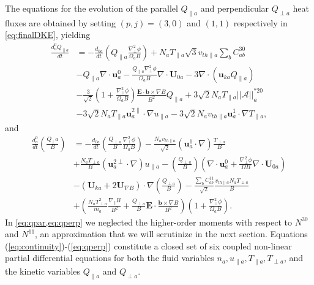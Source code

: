 {{\begin{equation}
\end{equation}
%
The equations for the evolution of the parallel $Q_{\parallel a}$ and perpendicular $Q_{\perp a}$ heat fluxes are obtained by setting $(p,j)=(3,0)$ and $(1,1)$ respectively in \cref{eq:finalDKE}, yielding
%
\begin{equation}
    \begin{split}
        \frac{d_a^0 Q_{\parallel a}}{dt} &=-  \frac{d_{0 a}}{dt}\left(Q_{\parallel a}\frac{\nabla_\perp^2 \phi}{\Omega_a B}\right)+N_a T_{\parallel a} \sqrt{3} v_{th\parallel a} \sum_b C_{ab}^{30} \\
        &-Q_{\parallel a}\nabla \cdot \mathbf u_a^0- \frac{Q_{\parallel a} \nabla_\perp^2 \phi}{\Omega_a B}\nabla \cdot \mathbf U_{0 a} - 3 \nabla \cdot (\mathbf u_{k a} Q_{\parallel a})\\
        &-\frac{3}{\sqrt{2}}\left(1+\frac{\nabla_\perp^2 \phi}{\Omega_a B}\right)\frac{\mathbf E \cdot \mathbf b \times \nabla B}{B^2}Q_{\parallel a}+3 \sqrt{2}N_a T_{\parallel a} ||\mathcal{A}||_a^{*20}\\
        &-3 \sqrt{2}N_a T_{\parallel a} \mathbf u_a^{2\parallel} \cdot \nabla u_{\parallel a} - 3 \sqrt{2}N_a v_{th\parallel a} \mathbf u_a^1 \cdot \nabla T_{\parallel a},
    \end{split}
    \label{eq:qpar}
\end{equation}
%
and
%
\begin{equation}
    \begin{split}
        \frac{d_a^0}{dt}\left(\frac{Q_\perp a}{B}\right)&=- \frac{d_{0 a}}{dt}\left(\frac{Q_{\perp a}}{B}\frac{\nabla_\perp^2 \phi}{\Omega_a B}\right)-\frac{N_a v_{th\parallel a}}{\sqrt{2}}(\mathbf u_a^1 \cdot \nabla) \frac{T_{\perp a}}{B}\\
        &+\frac{N_a T_{\perp a}}{B}(\mathbf u_a^{2\perp} \cdot \nabla) u_{\parallel a}-\left(\frac{Q_{\perp a}}{B}\right)\left(\nabla \cdot \mathbf u_a^0 + \frac{\nabla_\perp^2 \phi}{\Omega B}\nabla \cdot \mathbf U_{0 a}\right)\\
        &-(\mathbf U_{k a} + 2 \mathbf U_{\nabla B})\cdot \nabla \left(\frac{Q_{\perp a}}{B}\right)-\frac{\sum_b C_{ab}^{11}}{\sqrt{2}}\frac{v_{th\parallel a}N_a T_{\perp a}}{B}\\
        &+\left(\frac{N_a T_{\perp a}^2}{m_a}\frac{\nabla_\parallel B}{B^2}+\frac{Q_{\perp a}}{B}\mathbf E \cdot \frac{\mathbf b \times \nabla B}{B^2}\right)\left(1+\frac{\nabla_\perp^2 \phi}{\Omega_a B}\right).
    \end{split}
    \label{eq:qperp}
\end{equation}
%
{In \cref{eq:qpar,eq:qperp} we neglected the higher-order moments with respect to $N^{30}$ and $N^{11}$, an approximation that we will scrutinize in the next section.}
Equations (\ref{eq:continuity})-(\ref{eq:qperp}) constitute a closed set of six coupled non-linear partial differential equations for both the fluid variables $n_a, u_{\parallel a}, T_{\parallel a}, T_{\perp a}$, and the kinetic variables $Q_{\parallel a}$ and $Q_{\perp a}$.

}}
